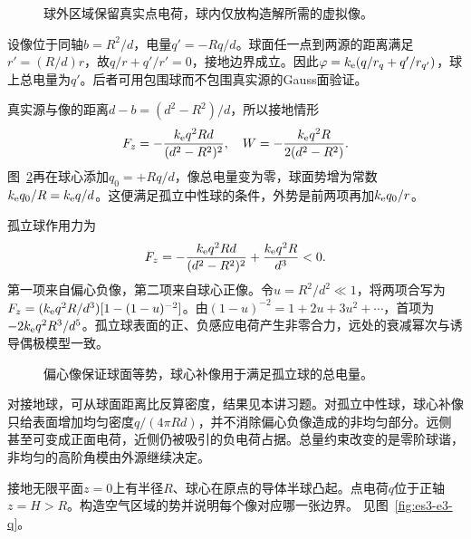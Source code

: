 \begin{figure}[H]\centering
{}
\caption{球外区域保留真实点电荷，球内仅放构造解所需的虚拟像。}\label{fig:es3-e2-q}
\end{figure}
\begin{solution}
设像位于同轴$b=R^2/d$，电量$q'=-Rq/d$。球面任一点到两源的距离满足$r'= (R/d)r$，故$q/r+q'/r'=0$，接地边界成立。因此$\varphi=k_{\rm e}(q/r_q+q'/r_{q'})$，球上总电量为$q'$。后者可用包围球而不包围真实源的Gauss面验证。

真实源与像的距离$d-b=(d^2-R^2)/d$，所以接地情形
\[F_z=-\frac{k_{\rm e} q^2Rd}{(d^2-R^2)^2},\quad
W=-\frac{k_{\rm e} q^2R}{2(d^2-R^2)}.
\]
图~\ref{fig:es3-e2-s}再在球心添加$q_0=+Rq/d$，像总电量变为零，球面势增为常数$k_{\rm e} q_0/R=k_{\rm e} q/d$。这便满足孤立中性球的条件，外势是前两项再加$k_{\rm e} q_0/r$。

孤立球作用力为
\[F_z=-\frac{k_{\rm e} q^2Rd}{(d^2-R^2)^2}+\frac{k_{\rm e} q^2R}{d^3}<0.
\]
第一项来自偏心负像，第二项来自球心正像。令$u=R^2/d^2\ll1$，将两项合写为$F_z=(k_{\rm e} q^2R/d^3)[1-(1-u)^{-2}]$。由$(1-u)^{-2}=1+2u+3u^2+\cdots$，首项为$-2k_{\rm e} q^2R^3/d^5$。孤立球表面的正、负感应电荷产生非零合力，远处的衰减幂次与诱导偶极模型一致。
\begin{figure}[H]\centering
{}
\caption{偏心像保证球面等势，球心补像用于满足孤立球的总电量。}\label{fig:es3-e2-s}
\end{figure}


对接地球，可从球面距离比反算密度，结果见本讲习题。对孤立中性球，球心补像只给表面增加均匀密度$q/(4\pi Rd)$，并不消除偏心负像造成的非均匀部分。远侧甚至可变成正面电荷，近侧仍被吸引的负电荷占据。总量约束改变的是零阶球谐，非均匀的高阶角模由外源继续决定。
\end{solution}

\begin{example}[接地平面上的半球凸起]\label{ex:es3-e3}
接地无限平面$z=0$上有半径$R$、球心在原点的导体半球凸起。点电荷$q$位于正轴$z=H>R$。构造空气区域的势并说明每个像对应哪一张边界。 见图~\ref{fig:es3-e3-q}。
\end{example}

